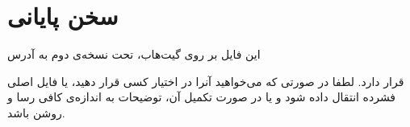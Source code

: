 \chapter{سخن پایانی}
این فایل بر روی گیت‌هاب، تحت نسخه‌ی دوم  به آدرس
\begin{center}
\end{center}
  قرار دارد. لطفا در صورتی که می‌خواهید آنرا در اختیار کسی قرار دهید، یا فایل اصلی فشرده انتقال داده شود و یا در صورت تکمیل آن، توضیحات به اندازه‌ی کافی رسا و روشن باشد.